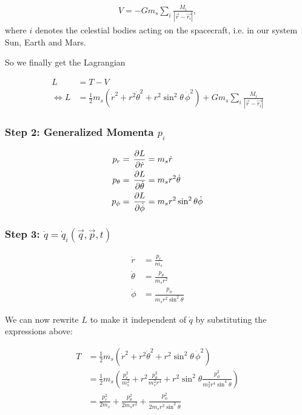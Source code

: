\begin{align}
    V = -G m_s \sum\limits_{i} \frac{M_i}{\left| \vec{r} - \vec{r_i} \right|},
\end{align}
where \(i\) denotes the celestial bodies acting on the spacecraft, i.e. in our system Sun, Earth and Mars.

So we finally get the Lagrangian

\begin{align}
    L &= T - V \\
    \Leftrightarrow L &= \frac{1}{2} m_s (\dot{r}^2 + r^2\dot{\theta}^2 + r^2\sin^2{\theta}\,\dot{\phi}^2) + G m_s \sum\limits_{i} \frac{M_i}{\left| \vec{r} - \vec{r_i} \right|}
\end{align}

\subsubsection{Step 2: Generalized Momenta \(p_i\)}
\begin{align}
    p_r &= \operatorname{}\frac{\partial L}{\partial \dot{r}} = m_s \dot{r} \label{eq:pr} \\
    p_\theta &= \operatorname{}\frac{\partial L}{\partial \dot{\theta}} = m_s r^2 \dot{\theta} \label{eq:ptheta} \\
    p_\phi &= \operatorname{}\frac{\partial L}{\partial \dot{\phi}} = m_s r^2 \sin^2{\theta} \dot{\phi} \label{eq:pphi}
\end{align}

\subsubsection{Step 3: \(\dot{q} = \dot{q}_i(\vec{q}, \vec{p}, t)\)}
\begin{align}
    \dot{r} &= \frac{p_r}{m_s} \\
    \dot{\theta} &= \frac{p_\theta}{m_s r^2} \\
    \dot{\phi} &= \frac{p_\phi}{m_s r^2 \sin^2{\theta}}
\end{align}

We can now rewrite \(L\) to make it independent of \(\dot{q}\) by substituting the expressions above:

\begin{align}
    T &= \frac{1}{2} m_s (\dot{r}^2 + r^2\dot{\theta}^2 + r^2\sin^2{\theta}\,\dot{\phi}^2) \\
    &= \frac{1}{2} m_s \left(\frac{p_r^2}{m_s^2} + r^2\frac{p_\theta^2}{m_s^2 r^4} + r^2\sin^2{\theta}\frac{p_\phi^2}{m_s^2 r^4 \sin^4{\theta}} \right) \\
    &= \frac{p_r^2}{2 m_s} + \frac{p_\theta^2}{2 m_s r^2} + \frac{p_\phi^2}{2 m_s r^2 \sin^2{\theta}} \\
\end{align}

